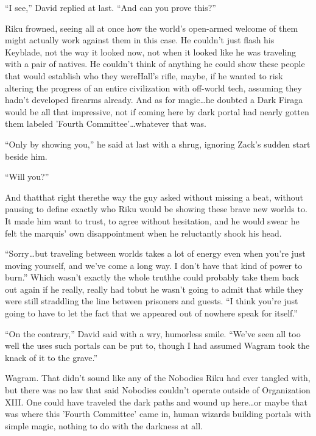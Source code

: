 ``I see,'' David replied at last. ``And can you prove this?''

Riku frowned, seeing all at once how the world's open-armed welcome of them might actually work against them in this case. He couldn't just flash his Keyblade, not the way it looked now, not when it looked like he was traveling with a pair of natives. He couldn't think of anything he could show these people that would establish who they were\textemdash Hall's rifle, maybe, if he wanted to risk altering the progress of an entire civilization with off-world tech, assuming they hadn't developed firearms already. And as for magic\ldots he doubted a Dark Firaga would be all that impressive, not if coming here by dark portal had nearly gotten them labeled 'Fourth Committee'\ldots whatever that was.

``Only by showing you,'' he said at last with a shrug, ignoring Zack's sudden start beside him.

``Will you?''

And that\textemdash that right there\textemdash the way the guy asked without missing a beat, without pausing to define exactly who Riku would be showing these brave new worlds to. It made him want to trust, to agree without hesitation, and he would swear he felt the marquis' own disappointment when he reluctantly shook his head.

``Sorry\ldots but traveling between worlds takes a lot of energy even when you're just moving yourself, and we've come a long way. I don't have that kind of power to burn.'' Which wasn't exactly the whole truth\textemdash he could probably take them back out again if he really, really had to\textemdash but he wasn't going to admit that while they were still straddling the line between prisoners and guests. ``I think you're just going to have to let the fact that we appeared out of nowhere speak for itself.''

``On the contrary,'' David said with a wry, humorless smile. ``We've seen all too well the uses such portals can be put to, though I had assumed Wagram took the knack of it to the grave.''

Wagram. That didn't sound like any of the Nobodies Riku had ever tangled with, but there was no law that said Nobodies couldn't operate outside of Organization XIII. One could have traveled the dark paths and wound up here\ldots or maybe that was where this 'Fourth Committee' came in, human wizards building portals with simple magic, nothing to do with the darkness at all.

